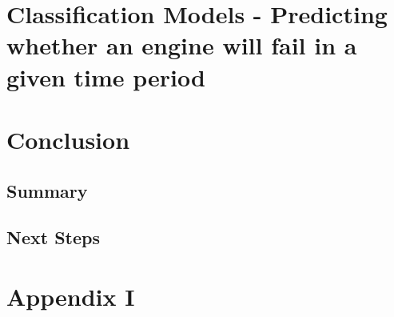 \documentclass{article}
\begin{document}
\section{Classification Models - Predicting whether an engine will fail in a given time period}
\newpage

\section{Conclusion}
\subsection{Summary}
\subsection{Next Steps}
\printbibliography
\section*{Appendix I}
\end{document}
